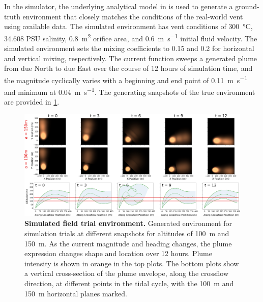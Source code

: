 In the simulator, the underlying analytical model in \PHUMES is used to generate a ground-truth environment that closely matches the conditions of the real-world vent using available data. The simulated environment has vent conditions of \SI{300}{\celsius}, 34.608 PSU salinity, \SI{0.8}{\meter\squared} orifice area, and \SI{0.6}{\meter\per\second} initial fluid velocity. The simulated environment sets the mixing coefficients to 0.15 and 0.2 for horizontal and vertical mixing, respectively. The current function sweeps a generated plume from due North to due East over the course of 12 hours of simulation time, and the magnitude cyclically varies with a beginning and end point of \SI{0.11}{\meter\per\second} and minimum at \SI{0.04}{\meter\per\second}. The generating snapshots of the true environment are provided in \cref{fig:sim_env}.

\begin{figure}[h!]
    \centering
    \includegraphics[width=1\columnwidth]{figures/sim_env.png}
    \caption[Simulated field trial environment.]{\textbf{Simulated field trial environment.} Generated environment for simulation trials at different snapshots for altitudes of \SI{100}{\meter} and \SI{150}{\meter}. As the current magnitude and heading changes, the plume expression changes shape and location over 12 hours. Plume intensity is shown in orange in the top plots. The bottom plots show a vertical cross-section of the plume envelope, along the crossflow direction, at different points in the tidal cycle, with the \SI{100}{\meter} and \SI{150}{\meter} horizontal planes marked.}
    \label{fig:sim_env}
\end{figure}

